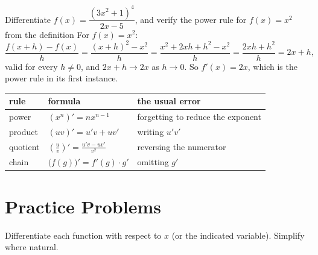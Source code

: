 \begin{worked}{Differentiate $f(x)=\dfrac{(3x^{2}+1)^{4}}{2x-5}$, and verify the power rule for $f(x)=x^{2}$ from the definition}
For $f(x)=x^{2}$:
\[
  \frac{f(x+h)-f(x)}{h}
  =\frac{(x+h)^{2}-x^{2}}{h}
  =\frac{x^{2}+2xh+h^{2}-x^{2}}{h}
  =\frac{2xh+h^{2}}{h}
  =2x+h ,
\]
valid for every $h\neq0$, and $2x+h\to2x$ as $h\to0$. So $f'(x)=2x$, which
is the power rule in its first instance.

\begin{center}\footnotesize
\begin{tabular}{lll}
  \hline
  rule & formula & the usual error\\
  \hline
  power & $(x^{n})'=nx^{n-1}$ & forgetting to reduce the exponent\\
  product & $(uv)'=u'v+uv'$ & writing $u'v'$\\
  quotient & $\left(\frac uv\right)'=\frac{u'v-uv'}{v^{2}}$ & reversing the numerator\\
  chain & $\bigl(f(g)\bigr)'=f'(g)\cdot g'$ & omitting $g'$\\
  \hline
\end{tabular}
\end{center}
\end{worked}

\section{Practice Problems}

Differentiate each function with respect to $x$ (or the indicated variable).
Simplify where natural.

